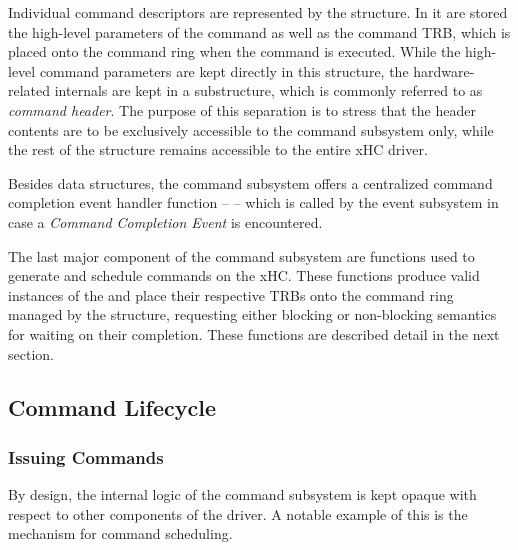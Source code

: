 Individual command descriptors are represented by the 
structure. In it are stored the high-level parameters of the command as well as
the command TRB, which is placed onto the command ring when the command is
executed. While the high-level command parameters are kept directly in this
structure, the hardware-related internals are kept in a substructure, which is
commonly referred to as \textit{command header}. The purpose of this separation
is to stress that the header contents are to be exclusively accessible to the
command subsystem only, while the rest of the structure remains accessible to
the entire xHC driver.

Besides data structures, the command subsystem offers a centralized command
completion event handler function --  --
which is called by the event subsystem in case a \textit{Command Completion
Event} is encountered.

The last major component of the command subsystem are functions used to generate
and schedule commands on the xHC. These functions produce valid instances of the
 and place their respective TRBs onto the command ring
managed by the  structure, requesting either blocking or
non-blocking semantics for waiting on their completion. These functions are
described detail in the next section.


\subsection{Command Lifecycle}

\subsubsection{Issuing Commands}

By design, the internal logic of the command subsystem is kept opaque with
respect to other components of the driver. A notable example of this is the
mechanism for command scheduling.

